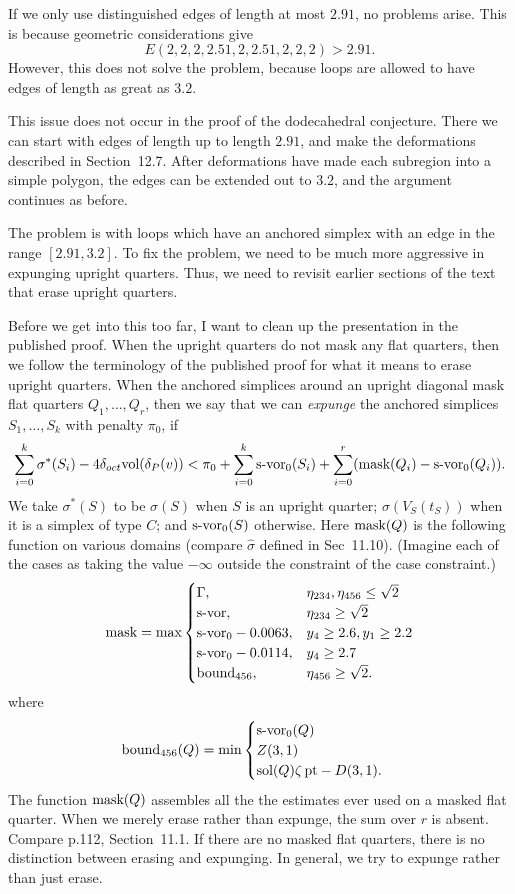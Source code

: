 \documentclass[11pt]{amsart}
\def\op#1{{\text{#1}}}
\def\text{\hbox}
\begin{document}
If we only use distinguished edges of length
at most $2.91$, no problems arise.  This is
because geometric considerations give
  $$E(2,2,2,2.51,2,2.51,2,2,2) > 2.91.$$
However, this does not solve the problem, because
loops are allowed to have edges of length as
great as $3.2$.

This issue does not occur in the proof of the dodecahedral conjecture.  There we can start with edges of length up to length $2.91$, and make the deformations described in Section~12.7.  After deformations have made each subregion into a simple polygon, the edges can be extended out to $3.2$, and the argument continues as before.

The problem is with loops which have an anchored simplex with an edge in the range $[2.91,3.2]$.  To fix the problem, we need to be much more aggressive 
in expunging upright quarters.  Thus, we need to revisit earlier sections of the text that erase upright quarters.

Before we get into this too far, I want to clean up the presentation in the published proof.  When the upright quarters do not mask any flat quarters, then we follow the terminology of the published proof for what it means to erase upright quarters.  When the anchored simplices around an upright diagonal mask flat quarters $Q_1,\ldots,Q_r$, then we say that we can {\it expunge} the anchored simplices $S_1,\ldots,S_k$ with penalty $\pi_0$, if 
  $$
  \sum_{i=0}^k \sigma^*(S_i) - 4\delta_{oct}\op{vol}(\delta_P(v))
  < \pi_0 + \sum_{i=0}^k \op{s-vor}_0(S_i)
   +\sum_{i=0}^r (\op{mask}(Q_i) - \op{s-vor}_0(Q_i)).
  $$
We take $\sigma^*(S)$ to be $\sigma(S)$ when $S$ is an upright quarter; $\sigma(V_S(t_S))$ when it is a simplex of type $C$; and $\op{s-vor}_0(S)$ otherwise.
Here $\op{mask}(Q)$ is the following function on various domains (compare $\hat\sigma$ defined in Sec~11.10).  (Imagine each of the
cases as taking the value $-\infty$ outside
the constraint of the case constraint.)
  $$
  \op{mask} = \op{max}
  \begin{cases}
  \Gamma{}{},   & \eta_{234},\eta_{456}\le \sqrt2\\
  \op{s-vor}, & \eta_{234}\ge \sqrt2\\
  \op{s-vor}_0 - 0.0063, & y_4\ge 2.6, y_1\ge 2.2\\
  \op{s-vor}_0 - 0.0114, & y_4 \ge 2.7\\
  \op{bound}_{456}, & \eta_{456}\ge \sqrt2.\\
  \end{cases}
  $$
where
  $$
  \op{bound}_{456}(Q) = \min
  \begin{cases}
  \op{s-vor}_0(Q) &\\
  Z(3,1) &\\
  \op{sol}(Q)\zeta\,\op{pt} - D(3,1).&\\
  \end{cases}
  $$
The function $\op{mask}(Q)$ assembles all the the estimates ever used
on a masked flat quarter.
When we merely erase rather than expunge, the sum over $r$ is absent. Compare p.112, Section~11.1.
If there are no masked flat quarters,  there is no distinction between erasing and expunging.   In general, we try to expunge rather than just erase.
\end{document}
